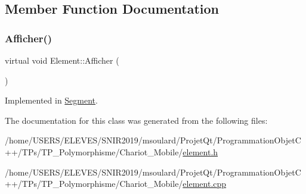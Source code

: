 \subsection{Member Function Documentation}
\mbox{\label{class_element_aa6fe26841512814e1e838c14c692daf0}} 
\subsubsection{\texorpdfstring{Afficher()}{Afficher()}}
{\footnotesize\ttfamily virtual void Element\+::\+Afficher (\begin{DoxyParamCaption}{ }\end{DoxyParamCaption})\hspace{0.3cm}{\ttfamily [pure virtual]}}



Implemented in \hyperlink{class_segment_a79c645f8ecf90ffa5818aa211e0f29d2}{Segment}.



The documentation for this class was generated from the following files\+:\begin{DoxyCompactItemize}
\item 
/home/\+U\+S\+E\+R\+S/\+E\+L\+E\+V\+E\+S/\+S\+N\+I\+R2019/msoulard/\+Projet\+Qt/\+Programmation\+Objet\+C++/\+T\+Ps/\+T\+P\+\_\+\+Polymorphisme/\+Chariot\+\_\+\+Mobile/\hyperlink{element_8h}{element.\+h}\item 
/home/\+U\+S\+E\+R\+S/\+E\+L\+E\+V\+E\+S/\+S\+N\+I\+R2019/msoulard/\+Projet\+Qt/\+Programmation\+Objet\+C++/\+T\+Ps/\+T\+P\+\_\+\+Polymorphisme/\+Chariot\+\_\+\+Mobile/\hyperlink{element_8cpp}{element.\+cpp}\end{DoxyCompactItemize}
